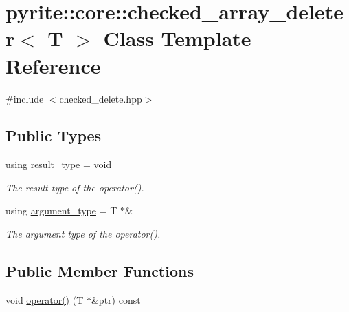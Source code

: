 \hypertarget{classpyrite_1_1core_1_1checked__array__deleter}{}\section{pyrite\+:\+:core\+:\+:checked\+\_\+array\+\_\+deleter$<$ T $>$ Class Template Reference}
\label{classpyrite_1_1core_1_1checked__array__deleter}


{\ttfamily \#include $<$checked\+\_\+delete.\+hpp$>$}

\subsection*{Public Types}
\begin{DoxyCompactItemize}
\item 
\mbox{\label{classpyrite_1_1core_1_1checked__array__deleter_a7ef0655773dffce21d70e0e3a6f92df3}} 
using \mbox{\hyperlink{classpyrite_1_1core_1_1checked__array__deleter_a7ef0655773dffce21d70e0e3a6f92df3}{result\+\_\+type}} = void
\begin{DoxyCompactList}\small\item\em The result type of the operator(). \end{DoxyCompactList}\item 
\mbox{\label{classpyrite_1_1core_1_1checked__array__deleter_aaeabc555e3b5feee6319e5c925ff8f5b}} 
using \mbox{\hyperlink{classpyrite_1_1core_1_1checked__array__deleter_aaeabc555e3b5feee6319e5c925ff8f5b}{argument\+\_\+type}} = T $\ast$\&
\begin{DoxyCompactList}\small\item\em The argument type of the operator(). \end{DoxyCompactList}\end{DoxyCompactItemize}
\subsection*{Public Member Functions}
\begin{DoxyCompactItemize}
\item 
void \mbox{\hyperlink{classpyrite_1_1core_1_1checked__array__deleter_a9ac9321cdd986f83350ab5707f9ed4b4}{operator()}} (T $\ast$\&ptr) const
\end{DoxyCompactItemize}


